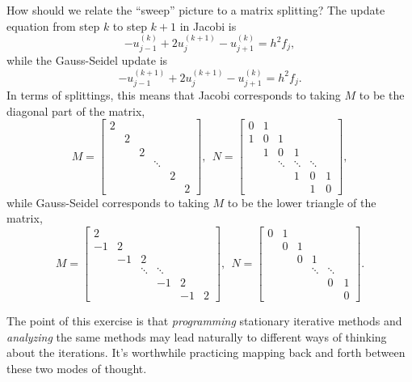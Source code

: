 \documentclass[12pt, leqno]{article}
\begin{document}
How should we relate the ``sweep'' picture to a matrix splitting?
The update equation from step $k$ to step $k+1$ in Jacobi is
\[
  -u_{j-1}^{(k)}+2u_j^{(k+1)}-u_{j+1}^{(k)} = h^2 f_j, 
\]
while the Gauss-Seidel update is
\[
  -u_{j-1}^{(k+1)}+2u_j^{(k+1)}-u_{j+1}^{(k)} = h^2 f_j.
\]
In terms of splittings, this means that Jacobi corresponds to
taking $M$ to be the diagonal part of the matrix,
\[
M =
\begin{bmatrix}
   2 &    \\
     &  2 &    \\
     &    &  2 &    \\
     &    &        & \ddots &  \\
     &    &        &    & 2 &  \\
     &    &        &    &   & 2
\end{bmatrix}, ~~
N =
\begin{bmatrix}
   0 &  1 \\
   1 &  0 &  1 \\
     &  1 &  0 & 1 \\
     &    & \ddots & \ddots & \ddots \\
     &    &        & 1 & 0 & 1 \\
     &    &        &   & 1 & 0
\end{bmatrix},
\]
while Gauss-Seidel corresponds to taking $M$ to be the lower triangle
of the matrix,
\[
M =
\begin{bmatrix}
   2 &  \\
  -1 &  2 &  \\
     & -1 &  2 &  \\
     &    & \ddots & \ddots &  \\
     &    &        & -1 & 2 &  \\
     &    &        &    & -1 & 2
\end{bmatrix}, ~~
N =
\begin{bmatrix}
   0 &  1 \\
     &  0 &  1 \\
     &    &  0 & 1 \\
     &    &    & \ddots & \ddots \\
     &    &        &  & 0 & 1 \\
     &    &        &    &   & 0
\end{bmatrix}.
\]

The point of this exercise is that {\em programming} stationary
iterative methods and {\em analyzing} the same methods may lead
naturally to different ways of thinking about the iterations.
It's worthwhile practicing mapping back and forth between these
two modes of thought.
\end{document}
